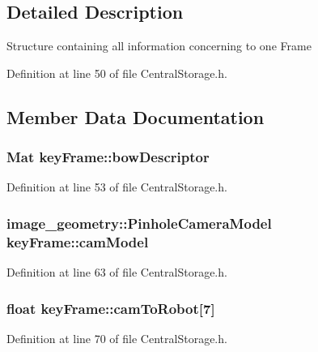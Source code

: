 \subsection{\-Detailed \-Description}
\-Structure containing all information concerning to one \-Frame 

\-Definition at line 50 of file \-Central\-Storage.\-h.



\subsection{\-Member \-Data \-Documentation}
\hypertarget{structkeyFrame_a12f22700cfe3b70f3a5e9f577503baf7}{
\subsubsection[{bow\-Descriptor}]{\setlength{\rightskip}{0pt plus 5cm}\-Mat {\bf key\-Frame\-::bow\-Descriptor}}}\label{structkeyFrame_a12f22700cfe3b70f3a5e9f577503baf7}


\-Definition at line 53 of file \-Central\-Storage.\-h.

\hypertarget{structkeyFrame_a61d24aeadcc9cfda14b6e99447a7971c}{
\subsubsection[{cam\-Model}]{\setlength{\rightskip}{0pt plus 5cm}image\-\_\-geometry\-::\-Pinhole\-Camera\-Model {\bf key\-Frame\-::cam\-Model}}}\label{structkeyFrame_a61d24aeadcc9cfda14b6e99447a7971c}


\-Definition at line 63 of file \-Central\-Storage.\-h.

\hypertarget{structkeyFrame_a6fe79b13fb7e8e5d3b1719fa35ae7afd}{
\subsubsection[{cam\-To\-Robot}]{\setlength{\rightskip}{0pt plus 5cm}float {\bf key\-Frame\-::cam\-To\-Robot}\mbox{[}7\mbox{]}}}\label{structkeyFrame_a6fe79b13fb7e8e5d3b1719fa35ae7afd}


\-Definition at line 70 of file \-Central\-Storage.\-h.

